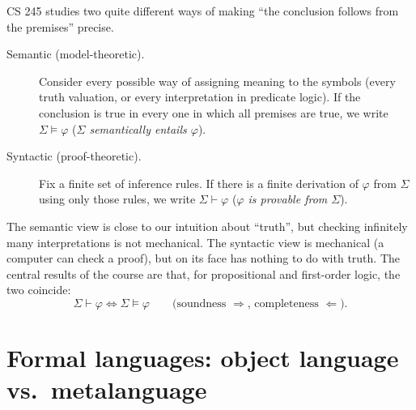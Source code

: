 CS 245 studies two quite different ways of making ``the conclusion follows from the
premises'' precise.

\begin{description}
  \item[Semantic (model-theoretic).] Consider every possible way of assigning meaning to
        the symbols (every truth valuation, or every interpretation in predicate logic).
        If the conclusion is true in every one in which all premises are true, we write
        $\Sigma \models \varphi$ (\emph{$\Sigma$ semantically entails $\varphi$}).
  \item[Syntactic (proof-theoretic).] Fix a finite set of inference rules. If there is a
        finite derivation of $\varphi$ from $\Sigma$ using only those rules, we write
        $\Sigma \vdash \varphi$ (\emph{$\varphi$ is provable from $\Sigma$}).
\end{description}

The semantic view is close to our intuition about ``truth'', but checking infinitely many
interpretations is not mechanical. The syntactic view is mechanical (a computer can check
a proof), but on its face has nothing to do with truth. The central results of the course
are that, for propositional and first-order logic, the two coincide:
\[
  \Sigma \vdash \varphi \iff \Sigma \models \varphi
  \qquad\text{(soundness $\Rightarrow$, completeness $\Leftarrow$).}
\]
\begin{center}
\end{center}

\section{Formal languages: object language vs.\ metalanguage}

